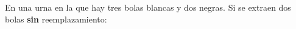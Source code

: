\documentclass[addpoints,spanish, 12pt,a4paper]{exam}
\begin{document}
\begin{questions}



\question En una urna en la que hay tres bolas blancas y dos negras. Si se extraen dos bolas \textbf{sin} reemplazamiento:





\end{questions}
\end{document}
